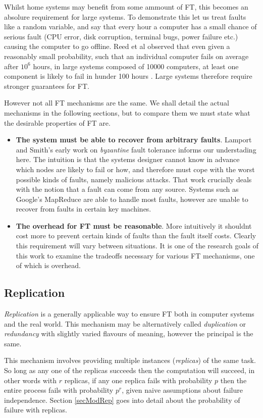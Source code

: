 Whilst home systems may benefit from some ammount of FT, this becomes an absolure requirement for large systems.
To demonstrate this let us treat faults like a random variable, and say that every hour a computer has a small chance of serious fault (CPU error, disk corruption, terminal bugs, power failure etc.) causing the computer to go offline.
Reed et al observed that even given a reasonably small probability, such that an individual computer fails on average after $10^6$ hours, in large systems composed of 10000 computers, at least one component is likely to fail in hunder 100 hours \cite{ree06}.
Large systems therefore require stronger guarantees for FT.

However not all FT mechanisms are the same.
We shall detail the actual mechanisms in the following sections, but to compare them we must state what the desirable properties of FT are.
\begin{itemize}
	\item	{\bf The system must be able to recover from arbitrary faults}.
			Lamport and Smith's early work on {\em byzantine} fault tolerance \cite{lam86} informs our understading here.
			The intuition is that the systems designer cannot know in advance which nodes are likely to fail or how, and therefore must cope with the worst possible kinds of faults, namely malicious attacks.
			That work crucially deals with the notion that a fault can come from any source.
			Systems such as Google's MapReduce \cite{dea08} are able to handle most faults, however are unable to recover from faults in certain key machines.
	\item	{\bf The overhead for FT must be reasonable}.
			More intuitively it shouldnt cost more to prevent certain kinds of faults than the fault itself costs.
			Clearly this requirement will vary between situations.
			It is one of the research goals of this work to examine the tradeoffs necessary for various FT mechanisms, one of which is overhead.
\end{itemize}

\subsection{Replication}
{\em Replication} is a generally applicable way to ensure FT both in computer systems and the real world.
This mechanism may be alternatively called {\em duplication} or {\em redundancy} with slightly varied flavours of meaning, however the principal is the same.

This mechanism involves providing multiple instances ({\em replicas}) of the same task.
So long as any one of the replicas succeeds then the computation will succeed, in other words with $r$ replicas, if any one replica fails with probability $p$ then the entire process fails with probability $p^r$, given naive assumptions about failure independence.
Section \ref{secModRep} goes into detail about the probability of failure with replicas.

